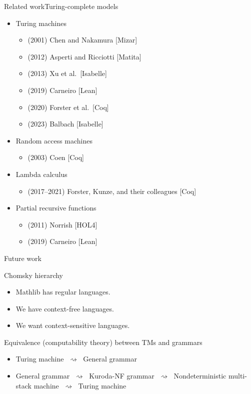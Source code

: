 \documentclass{beamer}
\begin{document}
	\begin{frame}{Related work}{Turing-complete models}
	\begin{itemize}
		\item Turing machines
		\begin{itemize}
			\item (2001) Chen and Nakamura [Mizar]
			\item (2012) Asperti and Ricciotti [Matita]
			\item (2013) Xu et al.\ [Isabelle]
			\item (2019) Carneiro [Lean]
			\item (2020) Forster et al.\ [Coq]
			\item (2023) Balbach [Isabelle]
		\end{itemize}
		\item Random access machines
		\begin{itemize}
			\item (2003) Coen [Coq]
		\end{itemize}
		\item Lambda calculus
		\begin{itemize}
			\item (2017--2021) Forster, Kunze, and their colleagues [Coq]
		\end{itemize}
		\item Partial recursive functions
		\begin{itemize}
			\item (2011) Norrish [HOL4]
			\item (2019) Carneiro [Lean]
		\end{itemize}
	\end{itemize}
	\end{frame}
	
	\begin{frame}{Future work}
		
		Chomsky hierarchy
		\begin{itemize}
			\item Mathlib has regular languages.
			\item We have context-free languages.
			\item We want context-sensitive languages.
		\end{itemize} \smallskip
		
		Equivalence (computability theory) between TMs and grammars
		\begin{itemize}
			\item Turing machine $\;\rightsquigarrow\;$ General grammar
			\item General grammar $\;\rightsquigarrow\;$ Kuroda-NF grammar $\;\rightsquigarrow\;$ Nondeterministic multi-stack machine $\;\rightsquigarrow\;$ Turing machine
		\end{itemize}
		
	\end{frame}
	
\end{document}
